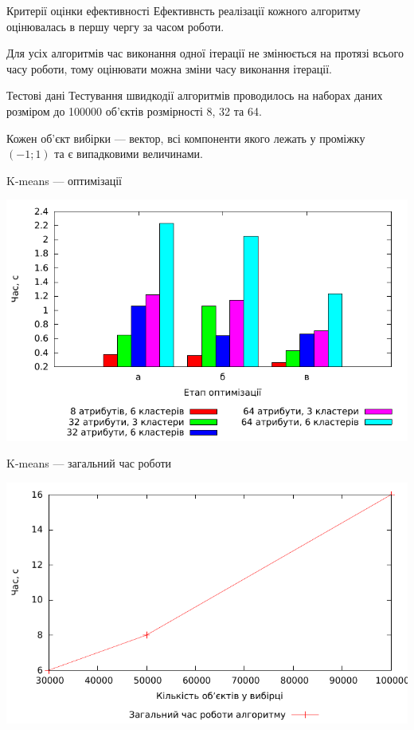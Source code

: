 \documentclass{beamer}
\begin{document}
    
    \begin{frame}{Критерії оцінки ефективності}
        Ефективнсть реалізації кожного алгоритму оцінювалась в першу чергу за часом роботи.
        
        Для усіх алгоритмів час виконання одної ітерації не змінюється на протязі всього часу роботи, тому оцінювати можна зміни часу виконання ітерації.
    \end{frame}
    
    
    \begin{frame}{Тестові дані}
        Тестування швидкодії алгоритмів проводилось на наборах даних розміром до 100000 об’єктів розмірності 8, 32 та 64.
        
        Кожен об’єкт вибірки --- вектор, всі компоненти якого лежать у проміжку $(-1; 1)$ та є випадковими величинами.
    \end{frame}
    
    
    \begin{frame}{K-means --- оптимізації}
        \begin{center}
            \includegraphics[scale=0.8]{kmeans_iteration_average.pdf}
        \end{center}
    \end{frame}
    
    
    \begin{frame}{K-means --- загальний час роботи}
        \begin{center}
            \includegraphics[scale=0.8]{kmeans_complexity.pdf}
        \end{center}
    \end{frame}
    
\end{document}
